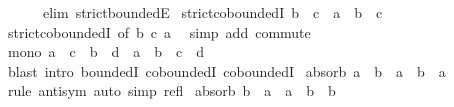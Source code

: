 \begin{isabellebody}
\ \ \ \ \ \ elim{\isacharcolon}{\kern0pt}\ strict{\isacharunderscore}{\kern0pt}boundedE{\isacharparenright}{\kern0pt}%
\endisatagproof
{\isafoldproof}%
%
\isadelimproof
\isanewline
%
\endisadelimproof
\isanewline
{}\isamarkupfalse%
\ strict{\isacharunderscore}{\kern0pt}coboundedI{}{\isacharcolon}{\kern0pt}\ {\isachardoublequoteopen}b\ \isactrlbold {\isacharless}{\kern0pt}\ c\ {\isasymLongrightarrow}\ a\ \isactrlbold {\isacharasterisk}{\kern0pt}\ b\ \isactrlbold {\isacharless}{\kern0pt}\ c{\isachardoublequoteclose}\isanewline
%
\isadelimproof
\ \ %
\endisadelimproof
%
\isatagproof
{}\isamarkupfalse%
\ strict{\isacharunderscore}{\kern0pt}coboundedI{}\ {\isacharbrackleft}{\kern0pt}of\ b\ c\ a{\isacharbrackright}{\kern0pt}\ \isamarkupfalse%
\ {\isacharparenleft}{\kern0pt}simp\ add{\isacharcolon}{\kern0pt}\ commute{\isacharparenright}{\kern0pt}%
\endisatagproof
{\isafoldproof}%
%
\isadelimproof
\isanewline
%
\endisadelimproof
\isanewline
{}\isamarkupfalse%
\ mono{\isacharcolon}{\kern0pt}\ {\isachardoublequoteopen}a\ \isactrlbold {\isasymle}\ c\ {\isasymLongrightarrow}\ b\ \isactrlbold {\isasymle}\ d\ {\isasymLongrightarrow}\ a\ \isactrlbold {\isacharasterisk}{\kern0pt}\ b\ \isactrlbold {\isasymle}\ c\ \isactrlbold {\isacharasterisk}{\kern0pt}\ d{\isachardoublequoteclose}\isanewline
%
\isadelimproof
\ \ %
\endisadelimproof
%
\isatagproof
{}\isamarkupfalse%
\ {\isacharparenleft}{\kern0pt}blast\ intro{\isacharcolon}{\kern0pt}\ boundedI\ coboundedI{}\ coboundedI{}{\isacharparenright}{\kern0pt}%
\endisatagproof
{\isafoldproof}%
%
\isadelimproof
\isanewline
%
\endisadelimproof
\isanewline
{}\isamarkupfalse%
\ absorb{}{\isacharcolon}{\kern0pt}\ {\isachardoublequoteopen}a\ \isactrlbold {\isasymle}\ b\ {\isasymLongrightarrow}\ a\ \isactrlbold {\isacharasterisk}{\kern0pt}\ b\ {\isacharequal}{\kern0pt}\ a{\isachardoublequoteclose}\isanewline
%
\isadelimproof
\ \ %
\endisadelimproof
%
\isatagproof
{}\isamarkupfalse%
\ {\isacharparenleft}{\kern0pt}rule\ antisym{\isacharparenright}{\kern0pt}\ {\isacharparenleft}{\kern0pt}auto\ simp{\isacharcolon}{\kern0pt}\ refl{\isacharparenright}{\kern0pt}%
\endisatagproof
{\isafoldproof}%
%
\isadelimproof
\isanewline
%
\endisadelimproof
\isanewline
{}\isamarkupfalse%
\ absorb{}{\isacharcolon}{\kern0pt}\ {\isachardoublequoteopen}b\ \isactrlbold {\isasymle}\ a\ {\isasymLongrightarrow}\ a\ \isactrlbold {\isacharasterisk}{\kern0pt}\ b\ {\isacharequal}{\kern0pt}\ b{\isachardoublequoteclose}\isanewline

\end{isabellebody}
